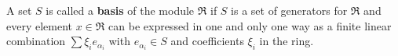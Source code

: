 A set $S$ is called a \textbf{basis} of the module $\mathfrak{R}$ if $S$ is a set of generators for $\mathfrak{R}$ and every element $x \in \mathfrak{R}$ can be expressed in one and only one way as a finite linear combination $\sum \xi_i e_{\alpha_i}$ with $e_{\alpha_i} \in S$ and coefficients $\xi_i$ in the ring.
